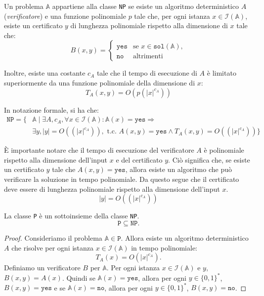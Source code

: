 \begin{tcolorbox}[title = {Classe \texttt{NP}}]
    Un problema $\mathbb{A}$ appartiene alla classe \texttt{NP} se esiste un algoritmo
    deterministico $A$ (\textit{verificatore}) e una funzione polinomiale $p$ tale che, per ogni istanza $x \in
    \mathscr{I}(\mathbb{A})$, esiste un certificato $y$ di lunghezza polinomiale rispetto
    alla dimensione di $x$ tale che:
    \[
        B(x, y) = \begin{cases}
            \texttt{yes} & \text{se } x \in \texttt{sol}(\mathbb{A}), \\
            \texttt{no} & \text{altrimenti}
        \end{cases}
    \]

    Inoltre, esiste una costante $c_A$ tale che il tempo di esecuzione di $A$ è limitato
    superiormente da una funzione polinomiale della dimensione di $x$:
    \[
        T_A(x, y) = O(p(|x|^{c_A}))
    \]

    In notazione formale, si ha che:
    \begin{align*}
        \texttt{NP} = \{ &\mathbb{A} \mid \exists A, c_A,
        \forall x \in \mathscr{I}(\mathbb{A}): \mathbb{A}(x) = \texttt{yes} \Rightarrow \\
        &\exists y, |y| = O((|x|^{c_A})), \text{ t.c. } A(x, y) = \texttt{yes} \land T_A(x, y) 
        = O((|x|^{c_A})) \}
    \end{align*}
\end{tcolorbox}
È importante notare che il tempo di esecuzione del verificatore $A$ è polinomiale rispetto 
alla dimensione dell'input $x$ e del certificato $y$. Ciò significa che, se esiste un
certificato $y$ tale che $A(x, y) = \texttt{yes}$, allora esiste un algoritmo che può
verificare la soluzione in tempo polinomiale. Da questo segue che il certificato deve 
essere di lunghezza polinomiale rispetto alla dimensione dell'input $x$.
\[
    |y| = O((|x|^{c_A}))  
\]

\begin{theorem}
    La classe \texttt{P} è un sottoinsieme della classe \texttt{NP}.
    \[
        \texttt{P} \subseteq \texttt{NP}.
    \]
\end{theorem}
\begin{proof}
    Consideriamo il problema $\mathbb{A} \in \texttt{P}$. Allora esiste un algoritmo 
    deterministico $A$ che risolve per ogni istanza $x \in \mathscr{I}(\mathbb{A})$ in
    tempo polinomiale:
    \[
        T_A(x) = O(|x|^{c_A}).
    \]
    Definiamo un verificatore $B$ per $\mathbb{A}$. Per ogni istanza
    $x \in \mathscr{I}(\mathbb{A})$ e $y$, $B(x, y) = A(x)$. 
    Quindi se $\mathbb{A}(x) = \texttt{yes}$, allora per ogni $y \in \{0,1\}^*$,
    $B(x, y) = \texttt{yes}$ e se $\mathbb{A}(x) = \texttt{no}$, allora per ogni
    $y \in \{0,1\}^*$, $B(x, y) = \texttt{no}$.
\end{proof}

